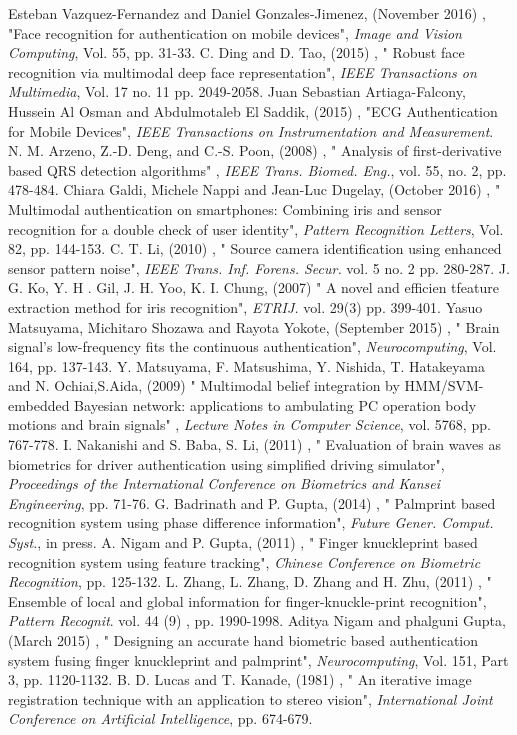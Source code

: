 \documentclass[10pt,a4paper,journal]{IEEEtran}
\begin{document}
\begin{thebibliography}{15}
Esteban Vazquez-Fernandez and Daniel Gonzales-Jimenez, (November 2016) ,  "Face recognition for authentication on mobile devices", \textit{Image and Vision Computing}, Vol. 55, pp. 31-33.
C. Ding and D. Tao, (2015) , " Robust face recognition via multimodal deep face representation", \textit{IEEE Transactions on Multimedia}, Vol. 17 no. 11  pp. 2049-2058.
Juan Sebastian Artiaga-Falcony, Hussein Al Osman and Abdulmotaleb El Saddik, (2015) , "ECG Authentication for Mobile Devices", \textit{IEEE Transactions on Instrumentation and Measurement}.
N. M. Arzeno, Z.-D. Deng, and C.-S. Poon, (2008) , " Analysis of first-derivative
based QRS detection algorithms" ,  \textit{IEEE Trans. Biomed. Eng.}, vol. 55, no. 2, pp. 478-484.
Chiara Galdi, Michele Nappi and Jean-Luc Dugelay, (October 2016) , " Multimodal authentication on smartphones: Combining iris and sensor recognition for a double check of user identity", \textit{Pattern Recognition Letters}, Vol. 82, pp. 144-153.
C. T. Li, (2010) , " Source camera identiﬁcation using enhanced sensor pattern noise", \textit{IEEE Trans. Inf. Forens. Secur.} vol. 5 no. 2  pp. 280-287.
J. G. Ko, Y. H . Gil, J. H. Yoo, K. I. Chung, (2007) " A novel and efficien tfeature extraction method for iris recognition", \textit{ETRIJ.} vol. 29(3)  pp. 399-401.
Yasuo Matsuyama, Michitaro Shozawa and Rayota Yokote, (September 2015) , " Brain signal’s low-frequency fits the continuous authentication", \textit{Neurocomputing}, Vol. 164, pp. 137-143.
Y. Matsuyama, F. Matsushima, Y. Nishida, T. Hatakeyama and N. Ochiai,S.Aida, (2009) " Multimodal belief integration by HMM/SVM-embedded Bayesian network: applications to ambulating PC operation body motions and brain signals" , \textit{Lecture Notes in Computer Science}, vol. 5768, pp. 767-778.
I. Nakanishi and S. Baba, S. Li, (2011) , " Evaluation of brain waves as biometrics for driver authentication using simpliﬁed driving simulator", \textit{Proceedings of the International  Conference  on  Biometrics  and  Kansei  Engineering}, pp. 71-76.
G. Badrinath and P. Gupta, (2014) , " Palmprint based recognition system using phase difference information", \textit{Future Gener. Comput. Syst.}, in press.
	A. Nigam and P. Gupta, (2011) , " Finger knuckleprint based recognition system  using feature tracking", \textit{Chinese Conference on Biometric Recognition}, pp. 125-132.
L. Zhang, L. Zhang, D. Zhang and H. Zhu, (2011) ,  " Ensemble of local and global information for ﬁnger-knuckle-print recognition", \textit{Pattern Recognit}. vol. 44 (9) , pp. 1990-1998.
Aditya Nigam and phalguni Gupta, (March 2015) , " Designing an accurate hand biometric based authentication system fusing finger knuckleprint and palmprint", \textit{Neurocomputing}, Vol. 151, Part 3, pp. 1120-1132.
B. D. Lucas and T. Kanade, (1981) ,  " An iterative image registration technique with an
 application to stereo vision", \textit{International Joint Conference on Artificial Intelligence}, pp. 674-679.


\end{thebibliography}
\end{document}
